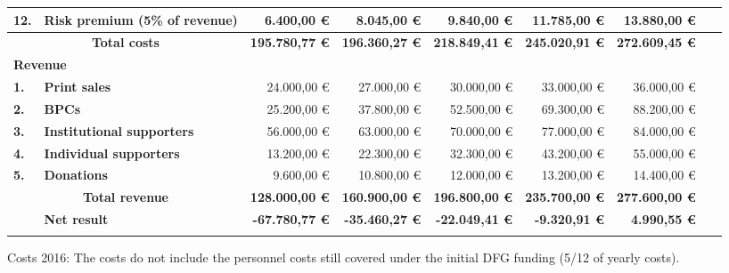 \documentclass[output=guidelines,nonflat,smallfont,
draftmode
]{langsci/langscibook}
\begin{document}
{{\begin{tabular}{ll rrrrr r}
\textbf{12.} & \textbf{Risk  premium  (5\% of revenue)} &  6.400,00 € &  8.045,00 € &  9.840,00 € &  11.785,00 € &  13.880,00 € & ~\\
\midrule
\multicolumn{2}{c}{ \textbf{Total costs}} &  \textbf{195.780,77 €} &  \textbf{196.360,27 €} &  \textbf{218.849,41 €} &  \textbf{245.020,91 €} &  \textbf{272.609,45 €} & \textbf{~}\\
 \midrule
\multicolumn{5}{l}{ \textbf{Revenue}}\\
\midrule
\textbf{1.} & \textbf{Print sales} &  24.000,00 € &  27.000,00 € &  30.000,00 € &  33.000,00 € &  36.000,00 €\\
\textbf{2.} & \textbf{BPCs} &  25.200,00 € &  37.800,00 € &  52.500,00 € &  69.300,00 € &  88.200,00 €\\
\textbf{3.} & \textbf{Institutional supporters} &  56.000,00 € &  63.000,00 € &  70.000,00 € &  77.000,00 € &  84.000,00 €\\
\textbf{4.} & \textbf{Individual supporters} &  13.200,00 € &  22.300,00 € &  32.300,00 € &  43.200,00 € &  55.000,00 €\\
\textbf{5.} & \textbf{Donations} &  9.600,00 € &  10.800,00 € &  12.000,00 € &  13.200,00 € &  14.400,00 €\\
\midrule
\multicolumn{2}{c}{ \textbf{Total revenue}} &  \textbf{128.000,00 €} &  \textbf{160.900,00 €} &  \textbf{196.800,00 €} &  \textbf{235.700,00 €} &  \textbf{277.600,00 €}\\
\midrule\midrule
{} & \textbf{Net result} &  \textbf{{}-67.780,77 €} &  \textbf{{}-35.460,27 €} &  \textbf{{}-22.049,41 €} &  \textbf{{}-9.320,91 €} &  \textbf{4.990,55 €}\\
\lspbottomrule
\end{tabular}
}

{\tiny *  {Costs 2016}: The costs do not include the personnel costs still covered under the initial DFG funding (5/12 of yearly costs).
}

}
\end{document}
